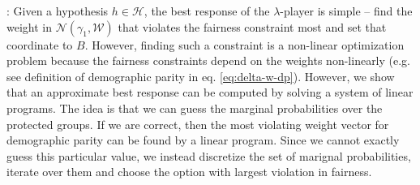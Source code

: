 \documentclass{article}
\newcommand{\WW}{\mathcal{W}}
\newcommand{\Ac}{\mathcal{A}}
\newcommand{\Nc}{\mathcal{N}}
\newcommand{\HH}{\mathcal{H}}
\newcommand{\eps}{\varepsilon}
\begin{document}


: Given a hypothesis $h\in \HH$, the best response of the $\lambda$-player is simple -- find the weight in $\Nc(\gamma_1,\WW)$ that violates the fairness constraint most and set that coordinate to $B$. However, finding such a constraint is a non-linear optimization problem because the fairness constraints depend on the weights non-linearly (e.g. see definition of demographic parity in eq. \ref{eq:delta-w-dp}). However, we show that an approximate best response can be computed by solving a system of
linear programs. The idea is that we can guess the marginal probabilities over the protected groups. If we are correct, then the most violating weight vector for demographic parity can be found by a linear program. Since we cannot exactly guess this particular value, we instead discretize the set of marignal probabilities, iterate over them and choose the option with largest violation in fairness.
\end{document}
